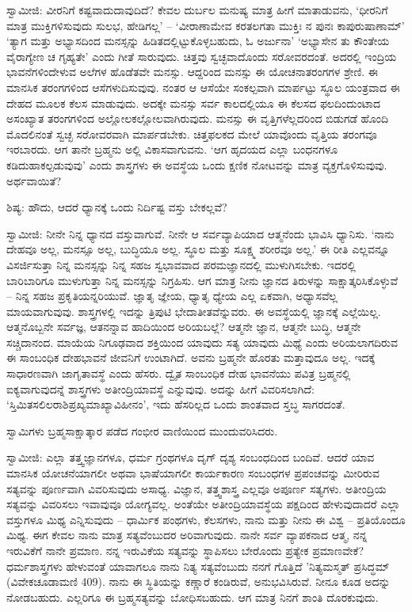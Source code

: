 ಸ್ವಾಮೀಜಿ: ವೀರನಿಗೆ ಕಷ್ಟವಾದುದಾವುದಿದೆ? ಕೇವಲ ದುರ್ಬಲ ಮನುಷ್ಯ ಮಾತ್ರ ಹೀಗೆ ಮಾತಾಡುವನು, ‘ಧೀರನಿಗೆ ಮಾತ್ರ ಮುಕ್ತಿಗಳಿಸುವುದು ಸುಲಭ, ಹೇಡಿಗಲ್ಲ’ – ‘ವೀರಾಣಾಮೇವ ಕರತಲಗತಾ ಮುಕ್ತಿಃ ನ ಪುನಃ ಕಾಪುರುಷಾಣಾಮ್’ ‘ತ್ಯಾಗ ಮತ್ತು ಅಭ್ಯಾಸದಿಂದ ಮನಸ್ಸನ್ನು ಹಿಡಿತದಲ್ಲಿಟ್ಟುಕೊಳ್ಳಬಹುದು, ಓ ಅರ್ಜುನಾ’ ‘ಅಭ್ಯಾಸೇನ ತು ಕೌಂತೇಯ ವೈರಾಗ್ಯೇಣ ಚ ಗೃಹ್ಯತೇ’ ಎಂದು ಗೀತೆ ಸಾರುವುದು. ಚಿತ್ತವು ಸ್ವಚ್ಛವಾದೊಂದು ಸರೋವರದಂತೆ. ಅದರಲ್ಲಿ ಇಂದ್ರಿಯ ಭಾವನೆಗಳಿಂದೇಳುವ ಅಲೆಗಳ ಹೊಡೆತವೇ ಮನಸ್ಸು. ಆದ್ದರಿಂದ ಮನಸ್ಸು ಈ ಯೋಚನಾತರಂಗಗಳ ಶ್ರೇಣಿ. ಈ ಮಾನಸಿಕ ತರಂಗಗಳಿಂದ ಆಸೆಗಳುದಿಸುವುವು. ನಂತರ ಆ ಆಸೆಯೇ ಸಂಕಲ್ಪವಾಗಿ ಮಾರ್ಪಟ್ಟು ಸ್ಥೂಲ ಯಂತ್ರವಾದ ಈ ದೇಹದ ಮೂಲಕ ಕೆಲಸ ಮಾಡುವುದು. ಅದಕ್ಕೇ ಮನಸ್ಸು ಸರ್ವ ಕಾಲದಲ್ಲಿಯೂ ಈ ಕೆಲಸದ ಫಲದಿಂದುಂಟಾದ ಅಸಂಖ್ಯಾತ ತರಂಗಗಳಿಂದ ಅಲ್ಲೋಲಕಲ್ಲೋಲವಾಗಿರುವುದು. ಮನಸ್ಸು ಈ ವೃತ್ತಿಗಳೆಲ್ಲದರಿಂದ ಬಿಡುಗಡೆ ಹೊಂದಿ ಮೊದಲಿನಂತೆ ಸ್ವಚ್ಛ ಸರೋವರವಾಗಿ ಮಾರ್ಪಡಬೇಕು. ಚಿತ್ತಫಲಕದ ಮೇಲೆ ಯಾವೊಂದು ವೃತ್ತಿಯ ತರಂಗವೂ ಇರಬಾರದು. ಆಗ ತಾನೇ ಬ್ರಹ್ಮನು ಅಲ್ಲಿ ವಿಕಾಸವಾಗುವನು. ‘ಆಗ ಹೃದಯದ ಎಲ್ಲಾ ಬಂಧನಗಳೂ ಕಡಿದುಹಾಕಲ್ಪಡುವುವು’ ಎಂದು ಶಾಸ್ತ್ರಗಳು ಈ ಅವಸ್ಥೆಯ ಒಂದು ಕ್ಷಣಿಕ ನೋಟವನ್ನು ಮಾತ್ರ ವ್ಯಕ್ತಗೊಳಿಸುವುವು. ಅರ್ಥವಾಯಿತೆ?

ಶಿಷ್ಯ: ಹೌದು, ಆದರೆ ಧ್ಯಾನಕ್ಕೆ ಒಂದು ನಿರ್ದಿಷ್ಟ ವಸ್ತು ಬೇಕಲ್ಲವೆ?

ಸ್ವಾಮೀಜಿ: ನೀನೇ ನಿನ್ನ ಧ್ಯಾನದ ವಸ್ತುವಾಗುವೆ. ನೀನೇ ಆ ಸರ್ವವ್ಯಾಪಿಯಾದ ಆತ್ಮನೆಂದು ಭಾವಿಸಿ ಧ್ಯಾನಿಸು. ‘ನಾನು ದೇಹವೂ ಅಲ್ಲ, ಮನಸ್ಸೂ ಅಲ್ಲ, ಬುದ್ಧಿಯೂ ಅಲ್ಲ. ಸ್ಥೂಲ ಮತ್ತು ಸೂಕ್ಷ್ಮ ಶರೀರವೂ ಅಲ್ಲ.’ ಈ ರೀತಿ ಎಲ್ಲವನ್ನೂ ವಿಸರ್ಜಿಸುತ್ತಾ ನಿನ್ನ ಮನಸ್ಸನ್ನು ನಿನ್ನ ಸಹಜ ಸ್ವಭಾವವಾದ ಪರಮಜ್ಞಾನದಲ್ಲಿ ಮುಳುಗಿಸಬೇಕು. ಇದರಲ್ಲಿ ಬಾರಿಬಾರಿಗೂ ಮುಳುಗುತ್ತಾ ನಿನ್ನ ಮನಸ್ಸನ್ನು ನಿಗ್ರಹಿಸು. ಆಗ ಮಾತ್ರ ನೀನು ಜ್ಞಾನದ ತಿರುಳನ್ನು ಸಾಕ್ಷಾತ್ಕರಿಸಿಕೊಳ್ಳುವೆ – ನಿನ್ನ ಸಹಜ ಪ್ರಕೃತಿಯನ್ನರಿಯುವೆ. ಜ್ಞಾತೃ ಜ್ಞೇಯ, ಧ್ಯಾತೃ ಧ್ಯೇಯ ಎಲ್ಲ ಏಕವಾಗಿ, ಅಧ್ಯಾಸವೆಲ್ಲ ಮಾಯವಾಗುವುವು. ಶಾಸ್ತ್ರಗಳಲ್ಲಿ ಇದನ್ನು ತ್ರಿಪುಟಿ ಭೇದಾತೀತವೆನ್ನುವರು. ಈ ಅವಸ್ಥೆಯಲ್ಲಿ ಜ್ಞಾನಕ್ಕೆ ಎಲ್ಲೆಯಿಲ್ಲ. ಆತ್ಮನೊಬ್ಬನೇ ಸರ್ವಜ್ಞ, ಆತನನ್ನಾವ ಹಾದಿಯಿಂದ ಅರಿಯಬಲ್ಲೆ? ಆತ್ಮನೇ ಜ್ಞಾನ, ಆತ್ಮನೇ ಬುದ್ಧಿ, ಆತ್ಮನೇ ಸಚ್ಚಿದಾನಂದ. ಮಾಯೆಯ ನಿಗೂಢವಾದ ಶಕ್ತಿಯಿಂದ ಯಾವುದು ಸತ್ಯ ಯಾವುದು ಮಿಥ್ಯೆ ಎಂದು ಅರಿಯಲಾಗದಿರುವ ಈ ಸಾಂಬಂಧಿಕ ದೇಹಭಾವನೆ ಜೀವನಿಗೆ ಉಂಟಾಗಿದೆ. ಅವನು ಬ್ರಹ್ಮನೇ ಹೊರತು ಮತ್ತಾವುದೂ ಅಲ್ಲ. ಇದಕ್ಕೆ ಸಾಧಾರಣವಾಗಿ ಜಾಗೃತಾವಸ್ಥೆ ಎಂದು ಹೆಸರು. ದ್ವೈತ ಸಾಂಬಂಧಿಕ ದೇಹ ಭಾವನೆಯು ಪವಿತ್ರ ಬ್ರಹ್ಮನಲ್ಲಿ ಐಕ್ಯವಾಗುವುದನ್ನೆ ಶಾಸ್ತ್ರಗಳು ಅತೀಂದ್ರಿಯಾವಸ್ಥೆ ಎನ್ನುವುವು. ಅದನ್ನು ಹೀಗೆ ವಿವರಿಸಲಾಗಿದೆ: ‘ಸ್ತಿಮಿತಸಲಿಲರಾಶಿಪ್ರಖ್ಯಮಾಖ್ಯಾವಿಹೀನಂ’, ಇದು ಹೆಸರಿಲ್ಲದ ಒಂದು ಶಾಂತವಾದ ಸ್ತಬ್ಧ ಸಾಗರದಂತೆ.

ಸ್ವಾಮಿಗಳು ಬ್ರಹ್ಮಸಾಕ್ಷಾತ್ಕಾರ ಪಡೆದ ಗಂಭೀರ ವಾಣಿಯಿಂದ ಮುಂದುವರಿಸಿದರು.

ಸ್ವಾಮೀಜಿ: ಎಲ್ಲಾ ತತ್ತ್ವಜ್ಞಾನಗಳೂ, ಧರ್ಮ ಗ್ರಂಥಗಳೂ ದೃಗ್ ದೃಶ್ಯ ಸಂಬಂಧದಿಂದ ಬಂದಿವೆ. ಆದರೆ ಯಾವ ಮಾನಸಿಕ ಯೋಚನೆಯಾಗಲೀ ಅಥವಾ ಭಾಷೆಯಾಗಲೀ ಕಾರ್ಯಕಾರಣ ಸಂಬಂಧಗಳ ಪ್ರಪಂಚವನ್ನು ಮೀರಿರುವ ಸತ್ಯವನ್ನು ಪೂರ್ಣವಾಗಿ ವಿವರಿಸುವುದು ಅಸಾಧ್ಯ. ವಿಜ್ಞಾನ, ತತ್ತ್ವಶಾಸ್ತ್ರ ಎಲ್ಲವೂ ಅಪೂರ್ಣ ಸತ್ಯಗಳು. ಅತೀಂದ್ರಿಯ ಸತ್ಯವನ್ನು ವಿವರಿಸಲು ಇವಾವುವೂ ಯೋಗ್ಯವಲ್ಲ. ಅಂತೆಯೇ ಅತೀಂದ್ರಿಯಾವಸ್ಥೆಯ ಪಕ್ಷದಿಂದ ಹೇಳುವುದಾದರೆ ಎಲ್ಲಾ ವಸ್ತುಗಳೂ ಮಿಥ್ಯ ಎನ್ನಿಸುವುದು – ಧಾರ್ಮಿಕ ಪಂಥಗಳು, ಕೆಲಸಗಳು, ನಾನು ಮತ್ತು ನೀನು ಈ ವಿಶ್ವ – ಪ್ರತಿಯೊಂದೂ ಮಿಥ್ಯ. ಈಗ ಕೇವಲ ನಾನು ಮಾತ್ರ ಸತ್ಯವೆಂಬುದರ ಅರಿವಾಗುವುದು. ನಾನೇ ಸರ್ವ ವ್ಯಾಪಕನಾದ ಆತ್ಮ, ನನ್ನ ಇರುವಿಕೆಗೆ ನಾನೇ ಪ್ರಮಾಣ. ನನ್ನ ಇರುವಿಕೆಯ ಸತ್ಯವನ್ನು ಸ್ಥಾಪಿಸಲು ಬೇರೊಂದು ಪ್ರತ್ಯೇಕ ಪ್ರಮಾಣವೇಕೆ? ಧರ್ಮಶಾಸ್ತ್ರಗಳು ಹೇಳುವಂತೆ ಯಾವಾಗಲೂ ನಾನು ನಿತ್ಯ ಸತ್ಯವೆಂಬುದು ನನಗೆ ಗೊತ್ತಿದೆ 'ನಿತ್ಯಮಸ್ಮತ್ ಪ್ರಸಿದ್ಧಮ್ (ವಿವೇಕಚೂಡಾಮಣಿ 409). ನಾನು ಈ ಸ್ಥಿತಿಯನ್ನು ಕಣ್ಣಾರೆ ಕಂಡಿರುವೆ, ಅನುಭವಿಸಿರುವೆ. ನೀನೂ ಕೂಡ ಅದನ್ನು ನೋಡಬಹುದು. ಎಲ್ಲರಿಗೂ ಈ ಬ್ರಹ್ಮಸತ್ಯವನ್ನು ಬೋಧಿಸಬಹುದು. ಆಗ ಮಾತ್ರ ನಿನಗೆ ಶಾಂತಿ ದೊರಕುವುದು.

